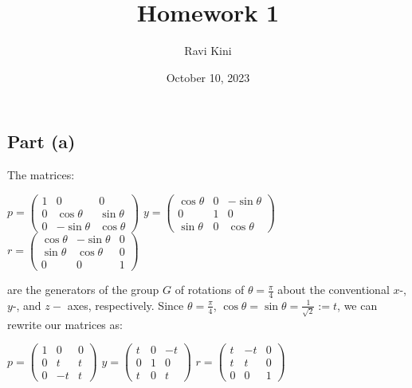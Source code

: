 \documentclass{article}
\title{Homework 1}
\author{Ravi Kini}
\date{October 10, 2023}
\begin{document}
\maketitle

\problem
\subsection*{Part (a)}
The matrices:
\begin{center}
    $p = 
    \begin{pmatrix} 
        1 & 0 & 0 \\
        0 & \cos\theta & \sin\theta  \\
        0 & -\sin\theta & \cos\theta
    \end{pmatrix}$
    \hspace{.25in}
    $y = 
    \begin{pmatrix} 
        \cos\theta & 0 & -\sin\theta \\
        0 & 1 &  0 \\
        \sin\theta & 0 & \cos\theta
    \end{pmatrix}$
    \hspace{.25in}
    $r = 
    \begin{pmatrix} 
        \cos\theta & -\sin\theta & 0 \\
        \sin\theta & \cos\theta  & 0 \\
        0 & 0 & 1
    \end{pmatrix}
    $
\end{center}
are the generators of the group $G$ of rotations of $\theta = \frac{\pi}{4}$ about the conventional $x$-, $y$-, and $z-$ axes, respectively. Since $\theta = \frac{\pi}{4}$, $\cos \theta = \sin \theta = \frac{1}{\sqrt{2}} := t$, we can rewrite our matrices as:
\begin{center}
    $p = 
    \begin{pmatrix} 
        1 & 0 & 0 \\
        0 & t & t  \\
        0 & -t & t
    \end{pmatrix}$
    \hspace{.25in}
    $y = 
    \begin{pmatrix} 
        t & 0 & -t \\
        0 & 1 &  0 \\
        t & 0 & t
    \end{pmatrix}$
    \hspace{.25in}
    $r = 
    \begin{pmatrix} 
        t & -t & 0 \\
        t  & t  & 0 \\
        0 & 0 & 1
    \end{pmatrix}
    $
\end{center}
\end{document}
